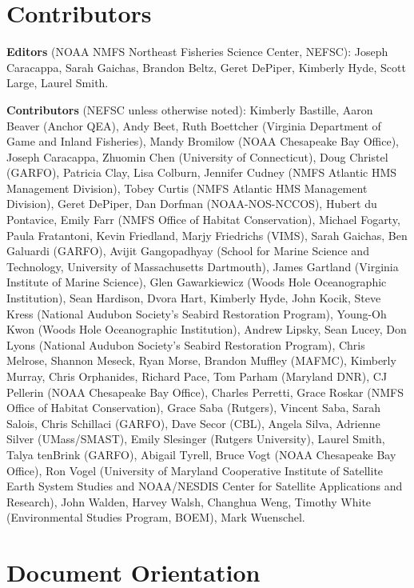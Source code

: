 \documentclass[
  10pt,
]{article}
\begin{document}
\hypertarget{contributors}{%
\section{Contributors}\label{contributors}}

\textbf{Editors} (NOAA NMFS Northeast Fisheries Science Center, NEFSC): Joseph Caracappa, Sarah Gaichas, Brandon Beltz, Geret DePiper, Kimberly Hyde, Scott Large, Laurel Smith.

\textbf{Contributors} (NEFSC unless otherwise noted): Kimberly Bastille, Aaron Beaver (Anchor QEA), Andy Beet, Ruth Boettcher (Virginia Department of Game and Inland Fisheries), Mandy Bromilow (NOAA Chesapeake Bay Office), Joseph Caracappa, Zhuomin Chen (University of Connecticut), Doug Christel (GARFO), Patricia Clay, Lisa Colburn, Jennifer Cudney (NMFS Atlantic HMS Management Division), Tobey Curtis (NMFS Atlantic HMS Management Division), Geret DePiper, Dan Dorfman (NOAA-NOS-NCCOS), Hubert du Pontavice, Emily Farr (NMFS Office of Habitat Conservation), Michael Fogarty, Paula Fratantoni, Kevin Friedland, Marjy Friedrichs (VIMS), Sarah Gaichas, Ben Galuardi (GARFO), Avijit Gangopadhyay (School for Marine Science and Technology, University of Massachusetts Dartmouth), James Gartland (Virginia Institute of Marine Science), Glen Gawarkiewicz (Woods Hole Oceanographic Institution), Sean Hardison, Dvora Hart, Kimberly Hyde, John Kocik, Steve Kress (National Audubon Society's Seabird Restoration Program), Young-Oh Kwon (Woods Hole Oceanographic Institution), Andrew Lipsky, Sean Lucey, Don Lyons (National Audubon Society's Seabird Restoration Program), Chris Melrose, Shannon Meseck, Ryan Morse, Brandon Muffley (MAFMC), Kimberly Murray, Chris Orphanides, Richard Pace, Tom Parham (Maryland DNR), CJ Pellerin (NOAA Chesapeake Bay Office), Charles Perretti, Grace Roskar (NMFS Office of Habitat Conservation), Grace Saba (Rutgers), Vincent Saba, Sarah Salois, Chris Schillaci (GARFO), Dave Secor (CBL), Angela Silva, Adrienne Silver (UMass/SMAST), Emily Slesinger (Rutgers University), Laurel Smith, Talya tenBrink (GARFO), Abigail Tyrell, Bruce Vogt (NOAA Chesapeake Bay Office), Ron Vogel (University of Maryland Cooperative Institute of Satellite Earth System Studies and NOAA/NESDIS Center for Satellite Applications and Research), John Walden, Harvey Walsh, Changhua Weng, Timothy White (Environmental Studies Program, BOEM), Mark Wuenschel.

\newpage

\hypertarget{document-orientation}{%
\section{Document Orientation}\label{document-orientation}}
\end{document}
